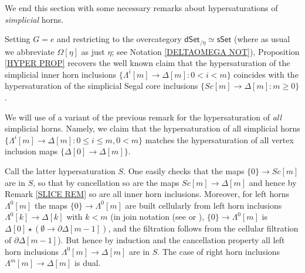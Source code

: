 \documentclass[a4paper,10pt
 ,draft
]{article}%
\begin{document}
We end this section with some necessary remarks about hypersaturations of \textit{simplicial} horns.


\begin{remark}\label{SLICE REM}
	Setting $G=e$ and restricting to the overcategory
	$\mathsf{dSet}_{/\eta} \simeq \mathsf{sSet}$ 
	(where as usual we abbreviate $\Omega[\eta]$ as just $\eta$; see Notation \ref{DELTAOMEGA NOT}),
	Proposition \ref{HYPER PROP}
	recovers the well known claim that 
	the hypersaturation of the simplicial inner horn inclusions
	$\{\Lambda^i[m] \to \Delta[m] \colon 0< i < m\}$
	coincides with the hypersaturation of the simplicial Segal core inclusions
	$\{Sc[m] \to \Delta[m]\colon m \geq 0\}$.
\end{remark}


\begin{remark}\label{HYPERSATKAN REM}
	We will use of a variant of the previous remark for the hypersaturation of \textit{all} simplicial horns.
	Namely, we claim that the hypersaturation of all simplicial horns 
	$\{\Lambda^i[m] \to \Delta[m] \colon 0 \leq i \leq m,0<m\}$
	matches the hypersaturation of all vertex inclusion maps
	$\{\Delta[0] \to \Delta[m]\}$.
	
	Call the latter hypersaturation $S$. 
	One easily checks that the maps $\{0\} \to Sc[m]$ are in $S$, so that by cancellation so are the maps 
	$Sc[m] \to \Delta[m]$ and hence by Remark \ref{SLICE REM} so are all inner horn inclusions. 
	Moreover, for left horns $\Lambda^0[m]$
	the maps $\{0\} \to \Lambda^0[m]$ are built cellularly
	from left horn inclusions
	$\Lambda^0[k] \to \Delta[k]$ with $k<m$
	(in join notation (see \cite[\S 1.2.8]{Lur09} or \cite[\S 7.4]{Per18}),
	$\{0\} \to \Lambda^0[m]$ is 
	$\Delta[0] \star (\emptyset \to \partial \Delta[m-1])$, and the filtration follows from the cellular filtration of $\partial \Delta[m-1]$).
	But hence by induction and the cancellation property all left horn inclusions 
	$\Lambda^0[m] \to \Delta[m]$
are in $S$. The case of right horn inclusions $\Lambda^m[m] \to \Delta[m]$ is dual.
\end{remark}
\end{document}
